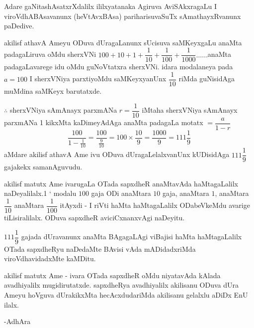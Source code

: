 Adare gaNitashAsatxrXdalilx ililxyatanaka Agiruva AviSAkxragaLu I viroVdhABAsa\-vanunx (heVtAvxBAsa) pariharisuvaSuTx sAmathayxRvanunx paDedive.

akilisf athavA Ameyu ODuva dUragaLanunx sUcisuva saMKeyxgaLu anaMta padagaLiruva oMdu sherxVNi $100+10+1+\dfrac{1}{10}+\dfrac{1}{100}+\dfrac{1}{1000}\ldots\ldots$anaMta padagaLavarege idu oMdu guNoVtatxra sherxVNi. idara modalaneya pada $a=100$ I sherxVNiya parxtiyoMdu saMKeyxyanUnx $\dfrac{1}{10}$ riMda guNisidAga muMdina saMKeyx barutatxde.

$\therefore$ sherxVNiya sAmAnayx parxmANa $r=\dfrac{1}{10}$ iMtaha sherxVNiya sAmAnayx parxmANa {\rm 1} kikxMta kaDimeyAdAga anaMta padagaLa motatx $=\dfrac{a}{1-r}$
$$
\frac{100}{1-\frac{1}{10}}=\frac{100}{\frac{9}{10}}=100\times \frac{10}{9}=\frac{1000}{9}=111\frac{1}{9}
$$
aMdare akilisf athavA Ame ivu ODuva dUragaLelalxvanUnx kUDisidAga $111\dfrac{1}{9}$ gajakekx samanAguvudu.

akilisf matutx Ame ivarugaLa OTada sapxdheR anaMtavAda haMtagaLalilx naDeyalilalx.1 ` modalu $100$ gaja ODi anaMtara $10$ gaja, anaMtara $1$, anaMtara $\dfrac{1}{10}$ anaMtara $\dfrac{1}{100}$ itAyxdi - I riVti haMta haMtagaLalilx ODabeVkeMdu avarige tiLisiralilalx. ODuva sapxdheR aviciCxnanxvAgi naDeyitu.

$111\dfrac{1}{9}$ gajada dUravanunx anaMta BAgagaLAgi viBajisi haMta haMtagaLalilx OTada sapxdheRyu naDedaMte BAvisi vAda mADidadxriMda viroVdhavidadxMte kaMDitu. 

akilisf matutx Ame - ivara OTada sapxdheR oMdu niyatavAda kAlada avadhiyalilx mugidirutatxde. sapxdheRya avadhiyalilx akilisanu ODuva dUra Ameyu hoVguva dUrakikxMta hecAcxdudariMda akilisanu gelalxlu aDiDx EnU ilalx.

\hfill{-AdhAra}

